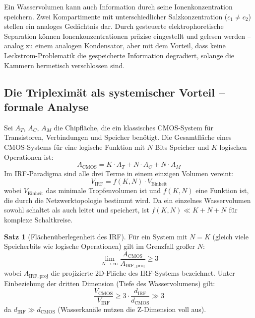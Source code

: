 ﻿\documentclass[a4paper,12pt]{scrreprt}
\theoremstyle{definition}
\newtheorem{satz}{Satz}[section]
\begin{document}
Ein Wasservolumen kann auch Information durch seine Ionenkonzentration
speichern. Zwei Kompartimente mit unterschiedlicher Salzkonzentration
($c_1 \neq c_2$) stellen ein analoges Gedächtnis dar. Durch gesteuerte
elektrophoretische Separation können Ionenkonzentrationen präzise eingestellt
und gelesen werden -- analog zu einem analogen Kondensator, aber mit dem
Vorteil, dass keine Leckstrom-Problematik die gespeicherte Information
degradiert, solange die Kammern hermetisch verschlossen sind.

\subsection{Die Tripleximät als systemischer Vorteil -- formale Analyse}

Sei $A_T$, $A_C$, $A_M$ die Chipfläche, die ein klassisches CMOS-System
für Transistoren, Verbindungen und Speicher benötigt. Die Gesamtfläche
eines CMOS-Systems für eine logische Funktion mit $N$ Bits Speicher und
$K$ logischen Operationen ist:
\begin{equation}
	A_{\mathrm{CMOS}} = K \cdot A_T + N \cdot A_C + N \cdot A_M
	\label{eq:cmos_flaeche}
\end{equation}
Im IRF-Paradigma sind alle drei Terme in einem einzigen Volumen vereint:
\begin{equation}
	V_{\mathrm{IRF}} = f(K, N) \cdot V_{\mathrm{Einheit}}
	\label{eq:irf_volumen}
\end{equation}
wobei $V_{\mathrm{Einheit}}$ das minimale Tropfenvolumen ist und $f(K,N)$
eine Funktion ist, die durch die Netzwerktopologie bestimmt wird.
Da ein einzelnes Wasservolumen sowohl schaltet als auch leitet und
speichert, ist $f(K,N) \ll K + N + N$ für komplexe Schaltkreise.

\begin{satz}[Flächenüberlegenheit des IRF]
	Für ein System mit $N = K$ (gleich viele Speicherbits wie logische Operationen)
	gilt im Grenzfall großer $N$:
	\begin{equation}
		\lim_{N\to\infty} \frac{A_{\mathrm{CMOS}}}{A_{\mathrm{IRF,proj}}} \geq 3
		\label{eq:ueberlegenheit}
	\end{equation}
	wobei $A_{\mathrm{IRF,proj}}$ die projizierte 2D-Fläche des IRF-Systems bezeichnet.
	Unter Einbeziehung der dritten Dimension (Tiefe des Wasservolumens) gilt:
	\begin{equation}
		\frac{V_{\mathrm{CMOS}}}{V_{\mathrm{IRF}}} \geq 3 \cdot \frac{d_{\mathrm{IRF}}}{d_{\mathrm{CMOS}}}
		\gg 3
		\label{eq:volumenueberlegenheit}
	\end{equation}
	da $d_{\mathrm{IRF}} \gg d_{\mathrm{CMOS}}$ (Wasserkanäle nutzen die Z-Dimension voll aus).
\end{satz}
\end{document}
